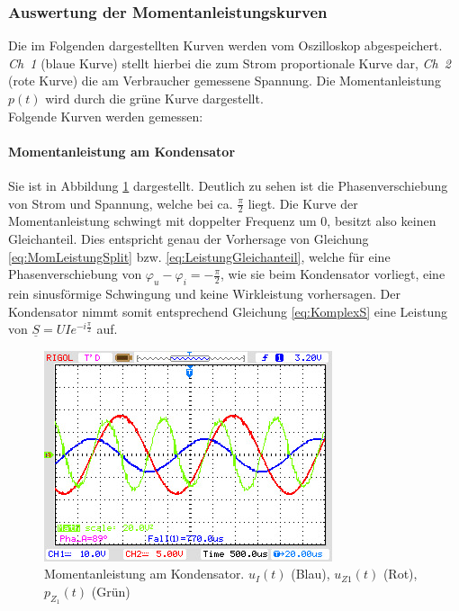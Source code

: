 \subsubsection{Auswertung der Momentanleistungskurven}

Die im Folgenden dargestellten Kurven werden vom Oszilloskop abgespeichert. \textit{Ch~1} (blaue Kurve) stellt hierbei die zum Strom proportionale Kurve dar, \textit{Ch~2} (rote Kurve) die am Verbraucher gemessene Spannung. Die Momentanleistung $p(t)$ wird durch die grüne Kurve dargestellt.
\\
Folgende Kurven werden gemessen:

\paragraph{Momentanleistung am Kondensator}
Sie ist in Abbildung \ref{fig:MomLKurveZ1} dargestellt. Deutlich zu sehen ist die Phasenverschiebung von Strom und Spannung, welche bei ca. $\frac{\pi}{2}$ liegt. Die Kurve der Momentanleistung schwingt mit doppelter Frequenz um 0, besitzt also keinen Gleichanteil. Dies entspricht genau der Vorhersage von Gleichung \eqref{eq:MomLeistungSplit} bzw. \eqref{eq:LeistungGleichanteil}, welche für eine Phasenverschiebung von $\varphi_u - \varphi_i = -\frac{\pi}{2}$, wie sie beim Kondensator vorliegt, eine rein sinusförmige Schwingung und keine Wirkleistung vorhersagen. Der Kondensator nimmt somit entsprechend Gleichung \eqref{eq:KomplexS} eine Leistung von $\underline{S} = UIe^{-i\frac{\pi}{2}}$ auf.\par

\begin{figure}[H]
\centering
\includegraphics[width=0.7\linewidth]{Oszi-Bitmaps/NewFile0.jpg}
\caption{Momentanleistung am Kondensator. $u_I(t)$ (Blau), $u_{Z1}(t)$ (Rot), $p_{Z_1}(t)$ (Grün)}
\label{fig:MomLKurveZ1}
\end{figure}

